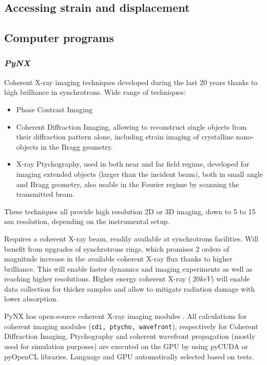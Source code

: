 \subsection{Accessing strain and displacement}


\lipsum


\subsection{Computer programs}

\subsubsection{\textit{PyNX}}
Coherent X-ray imaging techniques developed during the last 20 years thanks to high brilliance in synchrotrons. Wide range of techniques:

\begin{itemize}
    \item Phase Contrast Imaging
    \item Coherent Diffraction Imaging, allowing to reconstruct single objects from their diffraction pattern alone, including strain imaging of crystalline nano-objects in the Bragg geometry.
    \item X-ray Ptychography, used in both near and far field regime, developed for imaging extended objects (larger than the incident beam), both in small angle and Bragg geometry, also usable in the Fourier regime by scanning the transmitted beam.
\end{itemize}
These techniques all provide high resolution 2D or 3D imaging, down to 5 to 15 nm resolution, depending on the instrumental setup.

Requires a coherent X-ray beam, readily available at synchrotrons facilities. Will benefit from upgrades of synchrotrons rings, which promises 2 orders of magnitude increase in the available coherent X-ray flux thanks to higher brilliance. This will enable faster dynamics and imaging experiments as well as reaching higher resolutions.
Higher energy coherent X-ray ($\>20 keV$) will enable data collection for thicker samples and allow to mitigate radiation damage with lower absorption.

PyNX has open-source coherent X-ray imaging modules \parencite{Favre-Nicolin2020}. All calculations for coherent imaging modules (\texttt{cdi, ptycho, wavefront}), respectively for Coherent Diffraction Imaging, Ptychography and coherent wavefront propagation (mostly used for simulation purposes) are executed on the GPU by using pyCUDA or pyOpenCL libraries. Language and GPU automatically selected based on tests.

